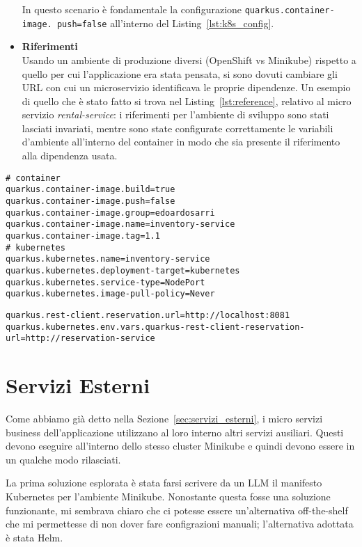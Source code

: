 \begin{itemize}
        In questo scenario è fondamentale la configurazione \texttt{quarkus.container-image. \allowbreak push=false} all'interno del Listing~\ref{lst:k8s_config}.
    \item \textbf{Riferimenti} \\
        Usando un ambiente di produzione diversi (OpenShift vs Minikube) rispetto a quello per cui l'applicazione era stata pensata, si sono dovuti cambiare gli URL con cui un microservizio identificava le proprie dipendenze. Un esempio di quello che è stato fatto si trova nel Listing~\ref{lst:reference}, relativo al micro servizio \textit{rental-service}: i riferimenti per l'ambiente di sviluppo sono stati lasciati invariati, mentre sono state configurate correttamente le variabili d'ambiente all'interno del container in modo che sia presente il riferimento alla dipendenza usata.
\end{itemize}

\begin{lstlisting}[caption=Kubernetes and Docker Configuration, label=lst:k8s_config]
# container
quarkus.container-image.build=true
quarkus.container-image.push=false
quarkus.container-image.group=edoardosarri
quarkus.container-image.name=inventory-service
quarkus.container-image.tag=1.1
# kubernetes
quarkus.kubernetes.name=inventory-service
quarkus.kubernetes.deployment-target=kubernetes
quarkus.kubernetes.service-type=NodePort
quarkus.kubernetes.image-pull-policy=Never
\end{lstlisting}

\begin{lstlisting}[caption=Reference in different environments, label=lst:reference]
quarkus.rest-client.reservation.url=http://localhost:8081
quarkus.kubernetes.env.vars.quarkus-rest-client-reservation-url=http://reservation-service
\end{lstlisting}

\section{Servizi Esterni}
Come abbiamo già detto nella Sezione~\ref{sec:servizi_esterni}, i micro servizi business dell'applicazione utilizzano al loro interno altri servizi ausiliari. Questi devono eseguire all'interno dello stesso cluster Minikube e quindi devono essere in un qualche modo rilasciati.

La prima soluzione esplorata è stata farsi scrivere da un LLM il manifesto Kubernetes per l'ambiente Minikube. Nonostante questa fosse una soluzione funzionante, mi sembrava chiaro che ci potesse essere un'alternativa off-the-shelf che mi permettesse di non dover fare configrazioni manuali; l'alternativa adottata è stata Helm.

